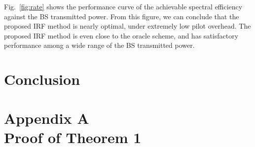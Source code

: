 \documentclass[12pt,draftclsnofoot,journal,onecolumn]{IEEEtran}
\theoremstyle{nonumberplain}
\begin{document}
    Fig.~\ref{fig:rate} shows the performance curve of the achievable spectral efficiency against the BS transmitted power. From this figure, we can conclude that the proposed IRF method is nearly optimal, under extremely low pilot overhead. The proposed IRF method is even close to the oracle scheme, and has satisfactory performance among a wide range of the BS transmitted power. 



\section{Conclusion}
\label{Conclusion}



\appendices
\section*{Appendix A\\ Proof of Theorem 1}\label{appendix:proof of theorem1}
\end{document}
